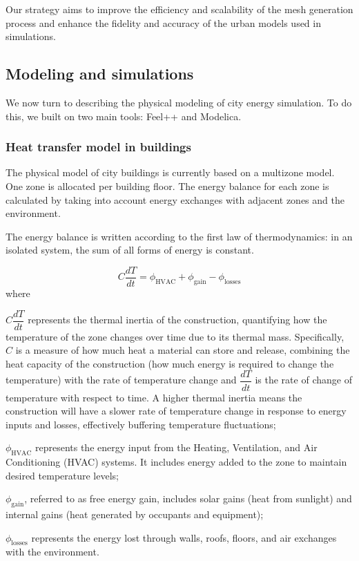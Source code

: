 \documentclass[runningheads]{llncs}
\begin{document}
Our strategy aims to improve the efficiency and scalability of the mesh generation process and enhance the fidelity and accuracy of the urban models used in simulations.

\subsection{Modeling and simulations}

We now turn to describing the physical modeling of city energy simulation.
To do this, we built on two main tools: Feel++ and Modelica.

\subsubsection{Heat transfer model in buildings}
\label{sec:heat-transfer-in-buildings}

The physical model of city buildings is currently based on a multizone model.
One zone is allocated per building floor. 
The energy balance for each zone is calculated by taking into account energy exchanges with adjacent zones and the environment.

The energy balance is written according to the first law of thermodynamics: in an isolated system, the sum of all forms of energy is constant.

\begin{equation}
    C \frac{dT}{dt} = \phi_{\mathrm{HVAC}} + \phi_{\mathrm{gain}} - \phi_{\mathrm{losses}}
\end{equation}
where
\begin{inparaenum}[\it (i)]
    \item $C \dfrac{dT}{dt}$ represents the thermal inertia of the construction, quantifying how the temperature of the zone changes over time due to its thermal mass. Specifically,
    $C$ is a measure of how much heat a material can store and release, combining the heat capacity of the construction (how much energy is required to change the temperature) with the rate of temperature change and 
    $\dfrac{dT}{dt}$ is the rate of change of temperature with respect to time. A higher thermal inertia means the construction will have a slower rate of temperature change in response to energy inputs and losses, effectively buffering temperature fluctuations;
    \item $\phi_{\mathrm{HVAC}}$ represents the energy input from the Heating, Ventilation, and Air Conditioning (HVAC) systems. It includes energy added to the zone to maintain desired temperature levels;
    \item $\phi_{\mathrm{gain}}$, referred to as free energy gain, includes solar gains (heat from sunlight) and internal gains (heat generated by occupants and equipment);
    \item $\phi_{\mathrm{losses}}$ represents the energy lost through walls, roofs, floors, and air exchanges with the environment.
\end{inparaenum}
\end{document}
